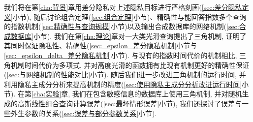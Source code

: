 我们将在第\ref{cha:背景}章用差分隐私对上述隐私目标进行严格刻画(\ref{sec:差分隐私定义}小节), 随后讨论组合定理(\ref{sec:组合定理}小节)、精确性与能回答指数多个查询的指数机制(\ref{sec:精确性与查询规模}小节)以及输出合成数据库的网络机制(\ref{sec:合成数据库}小节).  我们在第\ref{cha:理论}章对一大类光滑查询提出了三角机制, 证明了其同时保证隐私性、精确性(\ref{sec:_epsilon_差分隐私机制}小节与\ref{sec:_epsilon_delta_差分隐私机制}小节). 与现有的指数时间代价的机制相比, 三角机制时间代价为多项式, 并对高度光滑的函数拥有比现有机制更好的精确性保证(\ref{sec:与网络机制的性能对比}小节). 随后我们进一步改进三角机制的运行时间, 并利用隐私主成分分析来提高机制的精度(\ref{sec:使用隐私主成分分析改进运行时间}小节). 在第\ref{cha:实验}章, 我们在包含敏感信息的数据库上使用三角机制, 并对随机生成的高斯线性组合查询计算误差(\ref{sec:最坏情形误差}小节), 我们还探讨了误差与一些外生参数的关系(\ref{sec:误差与部分参数关系}小节).

